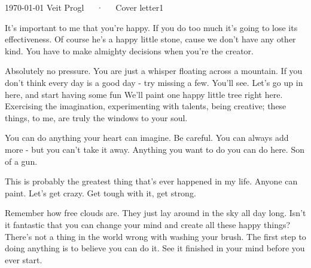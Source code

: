 \documentclass[ngerman, 11pt, a4paper]{awesome-cv}
\begin{document}
\makecvheader[R]

\makecvfooter
  {\today}
  {Veit Progl~~~·~~~Cover letter}1
  {}

\makelettertitle

\begin{cvletter}

It's important to me that you're happy. If you do too much it's going to lose its effectiveness. Of course he's a happy little stone, cause we don't have any other kind. You have to make almighty decisions when you're the creator.

\WhyCompanyA


Absolutely no pressure. You are just a whisper floating across a mountain. If you don't think every day is a good day - try missing a few. You'll see. Let's go up in here, and start having some fun We'll paint one happy little tree right here. Exercising the imagination, experimenting with talents, being creative; these things, to me, are truly the windows to your soul.

You can do anything your heart can imagine. Be careful. You can always add more - but you can't take it away. Anything you want to do you can do here. Son of a gun.

This is probably the greatest thing that's ever happened in my life. Anyone can paint. Let's get crazy. Get tough with it, get strong.

Remember how free clouds are. They just lay around in the sky all day long. Isn't it fantastic that you can change your mind and create all these happy things? There's not a thing in the world wrong with washing your brush. The first step to doing anything is to believe you can do it. See it finished in your mind before you ever start.

\end{cvletter}


\makeletterclosing
\end{document}
